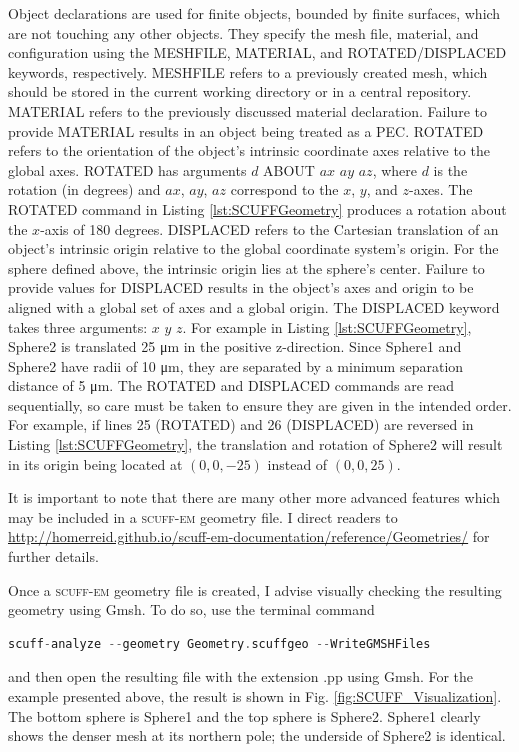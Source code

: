Object declarations are used for finite objects, bounded by finite surfaces, which are not touching any other objects. They specify the mesh file, material, and configuration using the MESHFILE, MATERIAL, and ROTATED/DISPLACED keywords, respectively. MESHFILE refers to a previously created mesh, which should be stored in the current working directory or in a central repository. MATERIAL refers to the previously discussed material declaration. Failure to provide MATERIAL results in an object being treated as a PEC. ROTATED refers to the orientation of the object's intrinsic coordinate axes relative to the global axes. ROTATED has arguments $d$ ABOUT $ax$ $ay$ $az$, where $d$ is the rotation (in degrees) and $ax$, $ay$, $az$ correspond to the $x$, $y$, and $z$-axes. The ROTATED command in Listing \ref{lst:SCUFFGeometry} produces a rotation about the $x$-axis of 180 degrees. DISPLACED refers to the Cartesian translation of an object's intrinsic origin relative to the global coordinate system's origin. For the sphere defined above, the intrinsic origin lies at the sphere's center. Failure to provide values for DISPLACED results in the object's axes and origin to be aligned with a global set of axes and a global origin. The DISPLACED keyword takes three arguments: $x$ $y$ $z$. For example in Listing \ref{lst:SCUFFGeometry}, Sphere2 is translated 25 \si{\micro\meter} in the positive z-direction. Since Sphere1 and Sphere2 have radii of 10 \si{\micro\meter}, they are separated by a minimum separation distance of 5 \si{\micro\meter}. The ROTATED and DISPLACED commands are read sequentially, so care must be taken to ensure they are given in the intended order. For example, if lines 25 (ROTATED) and 26 (DISPLACED) are reversed in Listing \ref{lst:SCUFFGeometry}, the translation and rotation of Sphere2 will result in its origin being located at $(0,0,-25)$ instead of $(0,0,25)$. 

It is important to note that there are many other more advanced features which may be included in a \textsc{scuff-em} geometry file. I direct readers to \url{http://homerreid.github.io/scuff-em-documentation/reference/Geometries/} for further details.

Once a \textsc{scuff-em} geometry file is created, I advise visually checking the resulting geometry using Gmsh. To do so, use the terminal command
%
\begin{lstlisting}[language=C++]
scuff-analyze --geometry Geometry.scuffgeo --WriteGMSHFiles
\end{lstlisting}
%
and then open the resulting file with the extension .pp using Gmsh. For the example presented above, the result is shown in Fig. \ref{fig:SCUFF_Visualization}. The bottom sphere is Sphere1 and the top sphere is Sphere2. Sphere1 clearly shows the denser mesh at its northern pole; the underside of Sphere2 is identical.

